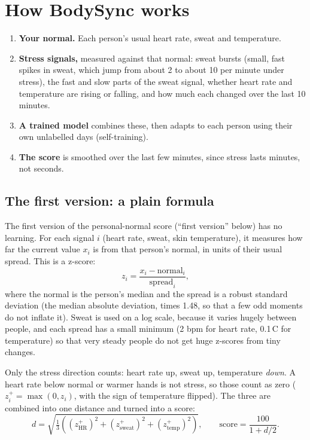 \documentclass{article}
\begin{document}
\section{How BodySync works}

\begin{enumerate}
\item \textbf{Your normal.} Each person's usual heart rate, sweat and temperature.
\item \textbf{Stress signals,} measured against that normal: sweat bursts (small, fast spikes in sweat, which jump from about 2 to about 10 per minute under stress), the fast and slow parts of the sweat signal, whether heart rate and temperature are rising or falling, and how much each changed over the last 10 minutes.
\item \textbf{A trained model} combines these, then adapts to each person using their own unlabelled days (self-training).
\item \textbf{The score} is smoothed over the last few minutes, since stress lasts minutes, not seconds.
\end{enumerate}

\subsection*{The first version: a plain formula}

The first version of the personal-normal score (``first version'' below) has no learning. For each signal $i$ (heart rate, sweat, skin temperature), it measures how far the current value $x_i$ is from that person's normal, in units of their usual spread. This is a z-score:
\[
z_i = \frac{x_i - \mathrm{normal}_i}{\mathrm{spread}_i},
\]
where the normal is the person's median and the spread is a robust standard deviation (the median absolute deviation, times 1.48, so that a few odd moments do not inflate it). Sweat is used on a log scale, because it varies hugely between people, and each spread has a small minimum (2 bpm for heart rate, 0.1\,\textdegree C for temperature) so that very steady people do not get huge z-scores from tiny changes.

Only the stress direction counts: heart rate up, sweat up, temperature \emph{down}. A heart rate below normal or warmer hands is not stress, so those count as zero ($z_i^+ = \max(0, z_i)$, with the sign of temperature flipped). The three are combined into one distance and turned into a score:
\[
d = \sqrt{\tfrac{1}{3}\left( (z^+_{\mathrm{HR}})^2 + (z^+_{\mathrm{sweat}})^2 + (z^+_{\mathrm{temp}})^2 \right)}, \qquad \mathrm{score} = \frac{100}{1 + d/2}.
\]
\end{document}
